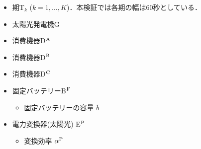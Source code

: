 \documentclass{jarticle}
\newcommand{\IB}{$\bullet$}
\newcommand{\IS}{$*$}
\begin{document}
\begin{itemize}
 \item[\IS] 期T$_k$ ($k=1,\ldots,K$)．本検証では各期の幅は$60$秒としている．
 \item[\IS] 太陽光発電機G
 \item[\IS] 消費機器D$^{\rm A}$
 \item[\IS] 消費機器D$^{\rm B}$
 \item[\IS] 消費機器D$^{\rm C}$
 \item[\IS] 固定バッテリーB$^{\rm F}$
  \begin{itemize}
   \item[\IB] 固定バッテリーの容量 $\overline{b}$
  \end{itemize}
 \item[\IS] 電力変換器(太陽光) E$^{\rm P}$
  \begin{itemize}
   \item[\IB] 変換効率 $\alpha^{\rm P}$


\end{itemize}
\end{itemize}
\end{document}
